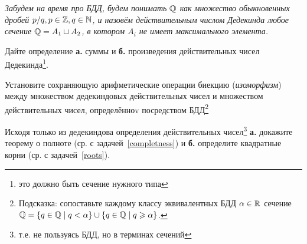 \documentclass[a4paper, 12pt, num=26]{listok}
\begin{document}
\textit{%
	Забудем на время про БДД, будем понимать $\mathbb{Q}$ как множество обыкновенных дробей
	$p/q, p \in \mathbb{Z}, q \in \mathbb{N}$, и назовём действительным числом Дедекинда любое сечение
	$\mathbb{Q} = A_1 \sqcup A_2$, в котором $A_i$ не имеет максимального элемента.
}

\begin{problem}
	Дайте определение \textbf{а.} суммы и \textbf{б.} произведения действительных чисел Дедекинда\footnote{это должно быть сечение нужного типа}.
\end{problem}
\begin{problem}
	Установите сохраняющую арифметические операции биекцию (\textit{изоморфизм}) между множеством
	дедекиндовых действительных чисел и множеством действительных чисел, определённоv посредством БДД\footnote{%
	Подсказка: сопоставьте каждому классу эквивалентных БДД $\alpha \in \mathbb{R}$ сечение
	$\mathbb{Q} = \{ q \in \mathbb{Q} \mid q < \alpha \} \cup \{ q \in \mathbb{Q} \mid q \geqslant \alpha \}$.}
\end{problem}
\begin{problem}
	Исходя только из дедекиндова определения действительных чисел\footnote{т.е. не пользуясь БДД, но в терминах сечений}
	\textbf{а.} докажите теорему о полноте (ср. с задачей~\ref{completness}) и \textbf{б.} определите квадратные корни (ср. с задачей~\ref{roots}).
\end{problem}
\end{document}
